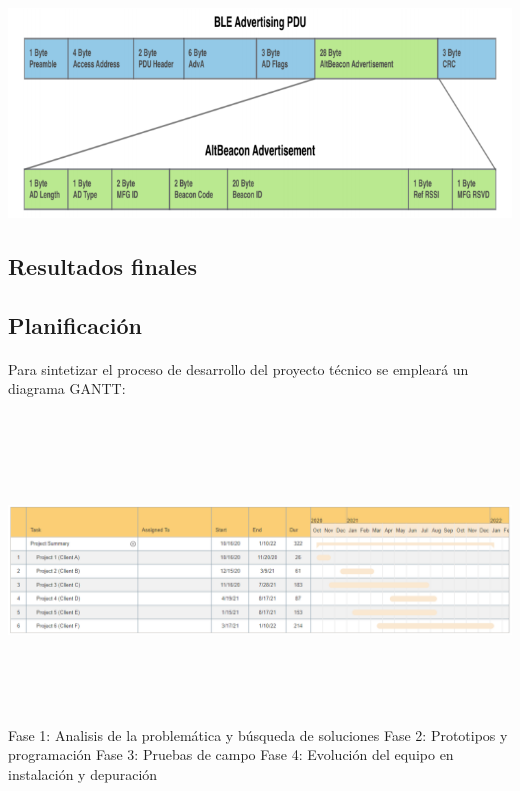\documentclass[a4paper ,12pt, onecolumn]{article}
\begin{document}
\begin{enumerate}
            \paragraph{}
            \includegraphics[scale=0.5]{tipos_beacon_altbeacon.PNG}
        \end{enumerate}
    \subsection{Resultados finales}
    \subsection{Planificación}
        \paragraph{}
        Para sintetizar el proceso de desarrollo del proyecto técnico se empleará un diagrama GANTT: 
        \paragraph{}
        \includegraphics[width=15cm, height=8cm]{gantt.PNG}
        Fase 1: Analisis de la problemática y búsqueda de soluciones
        Fase 2: Prototipos y programación
        Fase 3: Pruebas de campo
        Fase 4: Evolución del equipo en instalación y depuración 
\end{document}
